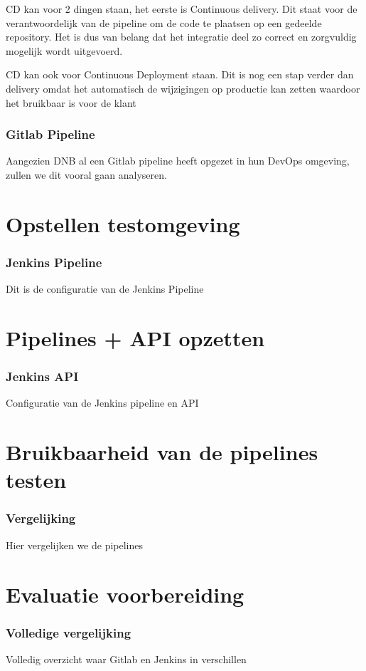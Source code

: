 CD kan voor 2 dingen staan, het eerste is Continuous delivery. Dit staat voor de verantwoordelijk van de pipeline om de code te plaatsen op een gedeelde repository. Het is dus van belang dat het integratie deel zo correct en zorgvuldig mogelijk wordt uitgevoerd. 

CD kan ook voor Continuous Deployment staan. Dit is nog een stap verder dan delivery omdat het automatisch de wijzigingen op productie kan zetten waardoor het bruikbaar is voor de klant \autocite{RedHat2023}

\section{Gitlab Pipeline}
Aangezien DNB al een Gitlab pipeline heeft opgezet in hun DevOps omgeving, zullen we dit vooral gaan analyseren.


\part{Opstellen testomgeving}
\section{Jenkins Pipeline}
Dit is de configuratie van de Jenkins Pipeline


\part{Pipelines + API opzetten}
\section{Jenkins API}
Configuratie van de Jenkins pipeline en API

\part{Bruikbaarheid van de pipelines testen}
\section{Vergelijking}
Hier vergelijken we de pipelines


\part{Evaluatie voorbereiding}
\section{Volledige vergelijking}
Volledig overzicht waar Gitlab en Jenkins in verschillen    